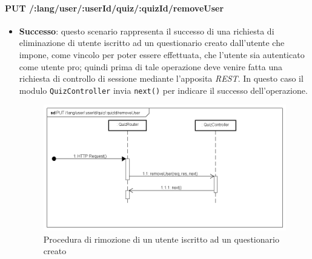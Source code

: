 \paragraph{PUT /:lang/user/:userId/quiz/:quizId/removeUser} %
\begin{itemize}
\item \textbf{Successo}: questo scenario rappresenta il successo di una richiesta di eliminazione di utente iscritto ad un questionario creato dall'utente che impone, come vincolo per poter essere effettuata, che l'utente sia autenticato come utente pro; quindi prima di tale operazione deve venire fatta una richiesta di controllo di sessione mediante l'apposita \textit{REST}. In questo caso il modulo \texttt{QuizController} invia \texttt{next()} per indicare il successo dell'operazione.
\label{Procedura di rimozione di utente iscritto ad un questionario}
\begin{figure}[ht]
	\centering
	\includegraphics[scale=0.40]{UML/DiagrammiDiSequenza/Back-end/PUT_lang_user__userId_quiz__quizIdRemoveUserSuccess.png}
	\caption{Procedura di rimozione di un utente iscritto ad un questionario creato}
\end{figure}
\FloatBarrier


\end{itemize}
